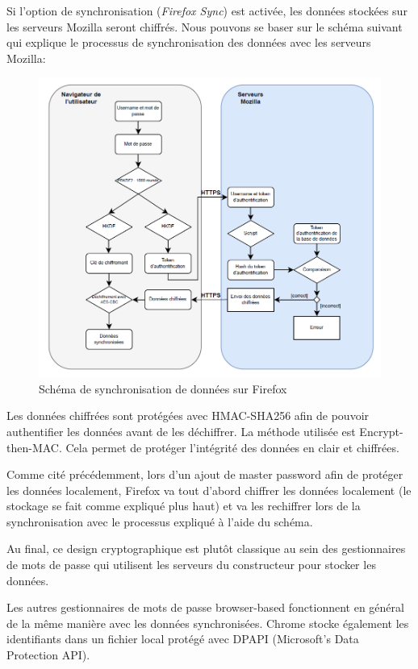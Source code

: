 Si l'option de synchronisation (\textit{Firefox Sync}) est activée\cite{firefoxsync}, les données stockées sur les serveurs Mozilla seront chiffrés. Nous pouvons se baser sur le schéma suivant qui explique le processus de synchronisation des données avec les serveurs Mozilla:
\begin{figure}[h!]
	\includegraphics[width=15.5cm]{images/firefox_sync.png}
		\centering
	\caption{Schéma de synchronisation de données sur Firefox}
\end{figure}

Les données chiffrées sont protégées avec HMAC-SHA256 afin de pouvoir authentifier les données avant de les déchiffrer. La méthode utilisée est Encrypt-then-MAC. Cela permet de protéger l'intégrité des données en clair et chiffrées.

Comme cité précédemment, lors d'un ajout de master password afin de protéger les données localement, Firefox va tout d'abord chiffrer les données localement (le stockage se fait comme expliqué plus haut) et va les rechiffrer lors de la synchronisation avec le processus expliqué à l'aide du schéma.

Au final, ce design cryptographique est plutôt classique au sein des gestionnaires de mots de passe qui utilisent les serveurs du constructeur pour stocker les données.

Les autres gestionnaires de mots de passe browser-based fonctionnent en général de la même manière avec les données synchronisées. Chrome stocke également les identifiants dans un fichier local protégé avec DPAPI (Microsoft's Data Protection API).

